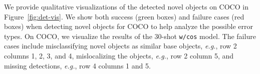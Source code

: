 We provide qualitative visualizations of the detected novel objects on COCO in Figure~\ref{fig:det-vis}.
We show both success (green boxes) and failure cases (red boxes) when detecting novel objects for COCO to help analyze the possible error types.
On COCO, we visualize the results of the 30-shot \texttt{\model w/cos} model.
The failure cases include misclassifying novel objects as similar base objects, \textit{e.g.}, row 2 columns 1, 2, 3, and 4, mislocalizing the objects, \textit{e.g.}, row 2 column 5, and missing detections, \textit{e.g.}, row 4 columns 1 and 5.


